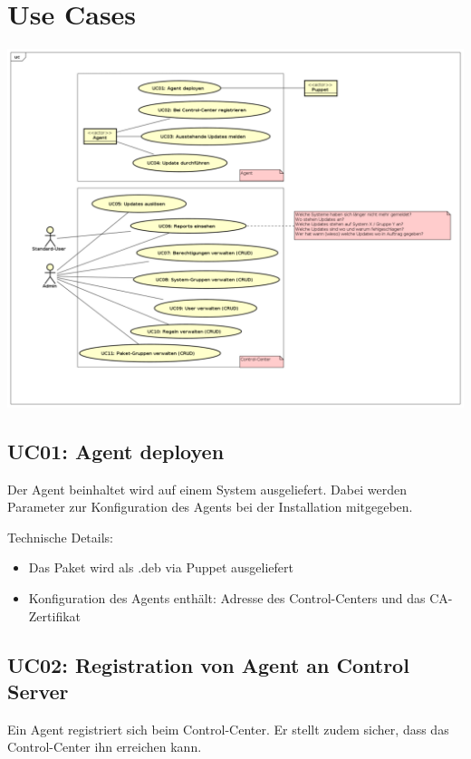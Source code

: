 \section{Use Cases}

\includegraphics[width=\textwidth]{files/UseCases_small}

\xxx[finish]

\subsection{UC01: Agent deployen}

Der Agent beinhaltet wird auf einem System ausgeliefert. Dabei werden Parameter zur Konfiguration des Agents bei der Installation mitgegeben.

Technische Details:

\begin{itemize}
    \item Das Paket wird als .deb via Puppet ausgeliefert
    \item Konfiguration des Agents enthält: Adresse des Control-Centers und das CA-Zertifikat
\end{itemize}


\subsection{UC02: Registration von Agent an Control Server}

Ein Agent registriert sich beim Control-Center. Er stellt zudem sicher, dass das Control-Center ihn erreichen kann.

